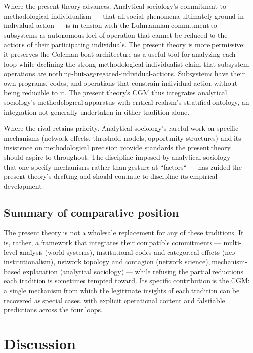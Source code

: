 \documentclass[12pt,a4paper]{article}
\begin{document}
Where the present theory advances. Analytical sociology's commitment to methodological individualism --- that all social phenomena ultimately ground in individual action --- is in tension with the Luhmannian commitment to subsystems as autonomous loci of operation that cannot be reduced to the actions of their participating individuals. The present theory is more permissive: it preserves the Coleman-boat architecture as a useful tool for analyzing each loop while declining the strong methodological-individualist claim that subsystem operations are nothing-but-aggregated-individual-actions. Subsystems have their own programs, codes, and operations that constrain individual action without being reducible to it. The present theory's CGM thus integrates analytical sociology's methodological apparatus with critical realism's stratified ontology, an integration not generally undertaken in either tradition alone.


Where the rival retains priority. Analytical sociology's careful work on specific mechanisms (network effects, threshold models, opportunity structures) and its insistence on methodological precision provide standards the present theory should aspire to throughout. The discipline imposed by analytical sociology --- that one specify mechanisms rather than gesture at ``factors`` --- has guided the present theory's drafting and should continue to discipline its empirical development.

\subsection{Summary of comparative position}

The present theory is not a wholesale replacement for any of these traditions. It is, rather, a framework that integrates their compatible commitments --- multi-level analysis (world-systems), institutional codes and categorical effects (neo-institutionalism), network topology and contagion (network science), mechanism-based explanation (analytical sociology) --- while refusing the partial reductions each tradition is sometimes tempted toward. Its specific contribution is the CGM: a single mechanism from which the legitimate insights of each tradition can be recovered as special cases, with explicit operational content and falsifiable predictions across the four loops.



\section{Discussion}
\end{document}
